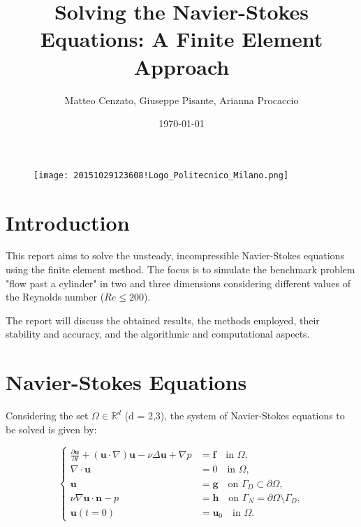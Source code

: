 \documentclass{article}
\title{Solving the Navier-Stokes Equations: A Finite Element Approach}
\author{ Matteo Cenzato, Giuseppe Pisante, Arianna Procaccio}
\date{\today}
\begin{document}
\maketitle

\begin{figure}[H]
    \centering
    \texttt{[image: 20151029123608!Logo\_Politecnico\_Milano.png]}
    \label{fig:enter-label}
\end{figure}



\newpage
\tableofcontents

\newpage
\section*{Introduction}

This report aims to solve the unsteady, incompressible Navier-Stokes equations using the finite element method. The focus is to simulate the benchmark problem "flow past a cylinder" in two and three dimensions considering different values of the Reynolds number (\(Re \leq 200\)).



The report will discuss the obtained results, the methods employed, their stability and accuracy, and the algorithmic and computational aspects.

\section*{Navier-Stokes Equations}

Considering the set $\Omega \in \mathbb{R}^d$ (d = 2,3), the system of Navier-Stokes equations to be solved is given by:

\begin{equation}
\begin{cases}
\frac{\partial \mathbf{u}}{\partial t} + (\mathbf{u} \cdot \nabla)\mathbf{u} - \nu \Delta \mathbf{u} + \nabla p &= \mathbf{f} \quad \text{in } \Omega , \\
\nabla \cdot \mathbf{u} &= 0 \quad \text{in } \Omega, \\
\mathbf{u} &= \mathbf{g} \quad \text{on } \Gamma_D \subset \partial \Omega, \\
\nu \nabla \mathbf{u} \cdot \mathbf{n} - p &= \mathbf{h} \quad \text{on } \Gamma_N = \partial \Omega \setminus \Gamma_D, \\
\mathbf{u}(t = 0) &= \mathbf{u}_0 \quad \text{in } \Omega.
\end{cases}
\end{equation}
\end{document}
